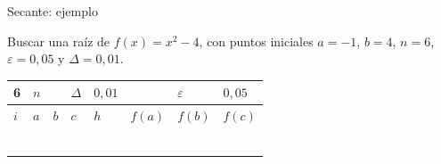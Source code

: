\documentclass[main.tex]{subfiles}
\begin{document}
\begin{frame}[t]{Secante: ejemplo}
\begin{minipage}[t][13mm][t]{\textwidth}\small Buscar una raíz de $f(x)=x^2-4$, con puntos iniciales $a=-1$, $b=4$, $n=6$, $\varepsilon=0{,}05$ y $\Delta=0{,}01$.\end{minipage}\par{\scriptsize\setlength{\tabcolsep}{2pt}\renewcommand{\arraystretch}{1}\begin{center}\begin{tabular}{|C{.04\textwidth}|C{.112\textwidth}|C{.112\textwidth}|C{.112\textwidth}|C{.112\textwidth}|C{.112\textwidth}|C{.112\textwidth}|C{.112\textwidth}|}
\hline
\rule{0pt}{4.3mm}6 & $n$ &  &  $\Delta$  & $0{,}01$ &  & $\varepsilon$ & $0{,}05$\\\hline
\rule{0pt}{4.3mm}$i$ & $a$ & $b$ & $c$ & $h$ & $f(a)$ & $f(b)$ & $f(c)$\\\hline
\rule{0pt}{4.3mm} &  &  &  &  &  &  & \\\hline
\rule{0pt}{4.3mm} &  &  &  &  &  &  & \\\hline
\rule{0pt}{4.3mm} &  &  &  &  &  &  & \\\hline
\rule{0pt}{4.3mm} &  &  &  &  &  &  & \\\hline
\rule{0pt}{4.3mm} &  &  &  &  &  &  & \\\hline
\rule{0pt}{4.3mm} &  &  &  &  &  &  & \\\hline
\end{tabular}\end{center}}\begin{minipage}[t][10mm][t]{\textwidth}\footnotesize \end{minipage}
\end{frame}
\end{document}
